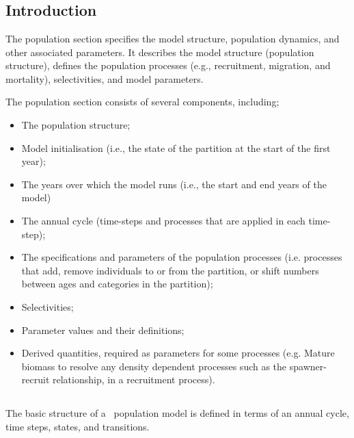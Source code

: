 \section{\label{sec:population-section}}

\subsection{Introduction}
The population section specifies the model structure, population dynamics, and other associated parameters. It describes the model structure (population structure), defines the population processes (e.g., recruitment, migration, and mortality), selectivities, and model parameters.

The population section consists of several components, including;
\begin{itemize}
  \item The population structure;
  \item Model initialisation (i.e., the state of the partition at the start of the first year);
  \item The years over which the model runs (i.e., the start and end years of the model)
  \item The annual cycle (time-steps and processes that are applied in each time-step);
  \item The specifications and parameters of the population processes (i.e. processes that add, remove individuals to or from the partition, or shift numbers between ages and categories in the partition);
  \item Selectivities;
  \item Parameter values and their definitions;
  \item Derived quantities, required as parameters for some processes (e.g. Mature biomass to resolve any density dependent processes such as the spawner-recruit relationship, in a recruitment process).
\end{itemize}


\subsection{}

The basic structure of a \CNAME\ population model is defined in terms of an annual cycle, time steps, states, and transitions.

